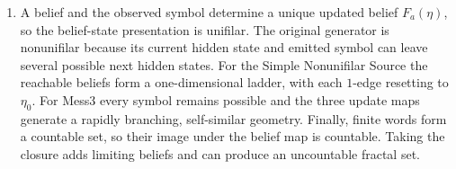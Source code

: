 \begin{solution}[ex:p3-3]
\begin{enumerate}
\begin{enumerate}
          \item A belief and the observed symbol determine a unique updated
            belief $F_a(\eta)$, so the belief-state presentation is unifilar.
            The original generator is nonunifilar because its current hidden
            state and emitted symbol can leave several possible next hidden
            states. For the Simple Nonunifilar Source the reachable beliefs
            form a one-dimensional ladder, with each $1$-edge resetting to
            $\eta_0$. For Mess3 every symbol remains possible and the three
            update maps generate a rapidly branching, self-similar geometry.
            Finally, finite words form a countable set, so their image under
            the belief map is countable. Taking the closure adds limiting
            beliefs and can produce an uncountable fractal set.
        \end{enumerate}
    \end{enumerate}
\end{solution}

